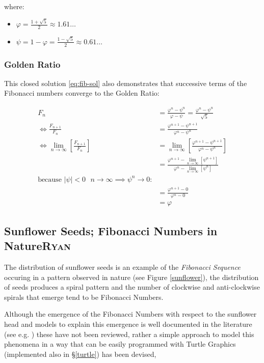 \documentclass[a4paper,11pt,twoside]{article}
\begin{document}
where:

\begin{itemize}
\item \(\varphi = \frac{1+ \sqrt{5} }{2} \approx 1.61\ldots\)
\item \(\psi = 1-\varphi = \frac{1- \sqrt{5} }{2} \approx 0.61\ldots\)
\end{itemize}

\subsubsection{Golden Ratio}
\label{sec:org39da35e}
This closed solution \eqref{eq:fib-sol} also demonstrates that successive terms of the Fibonacci numbers converge to the Golden Ratio:



\begin{align*}
    F_n &= \frac{\varphi^n-\psi^n}{\varphi-\psi} = \frac{\varphi^n-\psi^n}{\sqrt 5} \\
    \iff \frac{F_{n+1}}{F_n}	&= \frac{\varphi^{n+ 1} - \psi^{n+  1}}{\varphi^{n} - \psi^{n}} \\
    \iff \lim_{n \rightarrow \infty}\left[ \frac{F_{n+1}}{F_n} \right]	&= \lim_{n \rightarrow \infty}\left[ \frac{\varphi^{n+ 1} - \psi^{n+  1}}{\varphi^{n} - \psi^{n}} \right] \\
&= \frac{\varphi^{n+ 1} -\lim_{n \rightarrow \infty}\left[ \psi^{n +  1} \right] }{\varphi^{n} - \lim_{n \rightarrow \infty}\left[ \psi^n \right] } \\
\text{because $\mid \psi \mid < 0$ $n \rightarrow \infty \implies \psi^{n} \rightarrow 0$:} \\
&= \frac{\varphi^{n+  1} -  0}{\varphi^{n} -  0} \\
&= \varphi
\end{align*}

\subsection{Sunflower Seeds; Fibonacci Numbers in Nature\hfill{}\textsc{Ryan}}
\label{sunflower-example}
The distribution of sunflower seeds is an example of the \emph{Fibonacci Sequence}
occuring in a pattern observed in nature (see Figure \ref{sunflower}), the distribution of seeds produces a spiral pattern and the number of clockwise and anti-clockwise spirals that emerge tend to be Fibonacci Numbers. \cite{bohannonSunflowersShowComplex2016}

Although the emergence of the Fibonacci Numbers with respect to the sunflower head and models to explain this emergence is well documented in the literature (see e.g. \cite{ridleyPackingEfficiencySunflower1982,mathaiConstructingSunflowerHead1974,vogelBetterWayConstruct1979}) these have not been reviewed, rather a simple approach to model this phenomena in a way that can be easily programmed with Turtle Graphics (implemented also in \S \ref{turtle}) has been devised,
\end{document}
